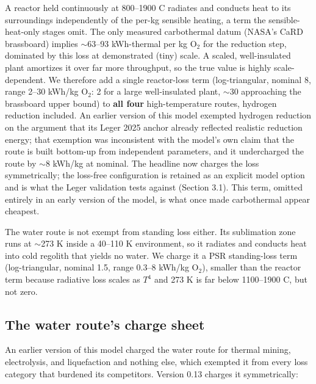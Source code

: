 \documentclass[11pt,a4paper]{article}
\begin{document}
A reactor held continuously at 800--1900 C radiates and conducts heat to its surroundings
independently of the per-kg sensible heating, a term the sensible-heat-only stages omit.
The only measured carbothermal datum (NASA's CaRD brassboard) implies $\sim$63--93
kWh-thermal per kg O$_2$ for the reduction step, dominated by this loss at demonstrated
(tiny) scale. A scaled, well-insulated plant amortizes it over far more throughput, so the
true value is highly scale-dependent. We therefore add a single reactor-loss term
(log-triangular, nominal 8, range 2--30 kWh/kg O$_2$: 2 for a large well-insulated plant,
$\sim$30 approaching the brassboard upper bound) to \textbf{all four} high-temperature
routes, hydrogen reduction included. An earlier version of this model exempted hydrogen
reduction on the argument that its Leger 2025 anchor already reflected realistic reduction
energy; that exemption was inconsistent with the model's own claim that the route is built
bottom-up from independent parameters, and it undercharged the route by $\sim$8 kWh/kg at
nominal. The headline now charges the loss symmetrically; the loss-free configuration is
retained as an explicit model option and is what the Leger validation tests against
(Section 3.1). This term, omitted entirely in an early version of the model, is what once
made carbothermal appear cheapest.

The water route is not exempt from standing loss either. Its sublimation zone runs at
$\sim$273 K inside a 40--110 K environment, so it radiates and conducts heat into cold
regolith that yields no water. We charge it a PSR standing-loss term (log-triangular,
nominal 1.5, range 0.3--8 kWh/kg O$_2$), smaller than the reactor term because radiative
loss scales as $T^4$ and 273 K is far below 1100--1900 C, but not zero.

\subsection{The water route's charge sheet}

An earlier version of this model charged the water route for thermal mining, electrolysis,
and liquefaction and nothing else, which exempted it from every loss category that
burdened its competitors. Version 0.13 charges it symmetrically:
\end{document}
